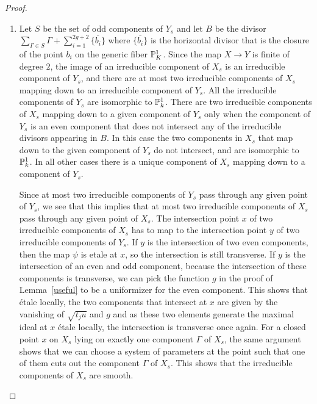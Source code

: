 \begin{proof} \hfill
\begin{enumerate}[\upshape (a)]
\item Let $S$ be the set of odd components of $Y_s$ and let $B$ be the divisor $\sum_{\Gamma \in S} \Gamma + \sum_{i=1}^{2g+2} \overline{ \{ b_i \} }$ where $\overline{ \{ b_i \} }$ is the horizontal divisor that is the closure of the point $b_i$ on the generic fiber $\P^1_K$. Since the map $X \rightarrow Y$ is finite of degree $2$, the image of an irreducible component of $X_s$ is an irreducible component of $Y_s$, and there are at most two irreducible components of $X_s$ mapping down to an irreducible component of $Y_s$. All the irreducible components of $Y_s$ are isomorphic to $\P^1_k$. There are two irreducible components of $X_s$ mapping down to a given component of $Y_s$ only when the component of $Y_s$ is an even component that does not intersect any of the irreducible divisors appearing in $B$. In this case the two components in $X_s$ that map down to the given component of $Y_s$ do not intersect, and are isomorphic to $\P^1_k$. In all other cases there is a unique component of $X_s$ mapping down to a component of $Y_s$.

Since at most two irreducible components of $Y_s$ pass through any given point of $Y_s$, we see that this implies that at most two irreducible components of $X_s$ pass through any given point of $X_s$. The intersection point $x$ of two irreducible components of $X_s$ has to map to the intersection point $y$ of two irreducible components of $Y_s$. If $y$ is the intersection of two even components, then the map $\psi$ is etale at $x$, so the intersection is still transverse. If $y$ is the intersection of an even and odd component, because the intersection of these components is transverse, we can pick the function $g$ in the proof of Lemma~\ref{useful} to be a uniformizer for the even component. This shows that \'{e}tale locally, the two components that intersect at $x$ are given by the vanishing of $\sqrt{t_ju}$ and $g$ and as these two elements generate the maximal ideal at $x$ \'{e}tale locally, the intersection is transverse once again. For a closed point $x$ on $X_s$ lying on exactly one component $\Gamma$ of $X_s$, the same argument shows that we can choose a system of parameters at the point such that one of them cuts out the component $\Gamma$ of $X_s$. This shows that the irreducible components of $X_s$ are smooth.


\end{enumerate}
\end{proof}
